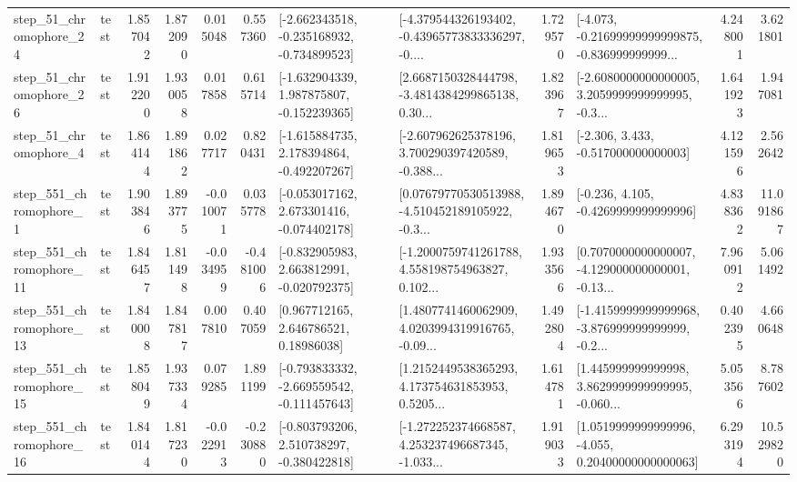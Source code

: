 \begin{tabular}{llrrrrllrlrr}
   step\_51\_chromophore\_24 &      test &      1.857042 &    1.872090 &      0.015048 &  0.557360 &  [-2.662343518, -0.235168932, -0.734899523] &  [-4.379544326193402, -0.43965773833336297, -0.... &       1.729570 &  [-4.073, -0.21699999999999875, -0.836999999999... &            4.248001 &          3.621801 \\
   step\_51\_chromophore\_26 &      test &      1.912200 &    1.930058 &      0.017858 &  0.615714 &   [-1.632904339, 1.987875807, -0.152239365] &  [2.6687150328444798, -3.4814384299865138, 0.30... &       1.823967 &  [-2.6080000000000005, 3.2059999999999995, -0.3... &            1.641923 &          1.947081 \\
    step\_51\_chromophore\_4 &      test &      1.864144 &    1.891862 &      0.027717 &  0.820431 &   [-1.615884735, 2.178394864, -0.492207267] &  [-2.607962625378196, 3.700290397420589, -0.388... &       1.819653 &                [-2.306, 3.433, -0.517000000000003] &            4.121596 &          2.562642 \\
   step\_551\_chromophore\_1 &      test &      1.903846 &    1.893775 &     -0.010071 &  0.035778 &   [-0.053017162, 2.673301416, -0.074402178] &  [0.07679770530513988, -4.510452189105922, -0.3... &       1.894670 &               [-0.236, 4.105, -0.4269999999999996] &            4.838362 &         11.091867 \\
  step\_551\_chromophore\_11 &      test &      1.846457 &    1.811498 &     -0.034959 & -0.481006 &   [-0.832905983, 2.663812991, -0.020792375] &  [-1.2000759741261788, 4.558198754963827, 0.102... &       1.933566 &  [0.7070000000000007, -4.129000000000001, -0.13... &            7.960912 &          5.061492 \\
  step\_551\_chromophore\_13 &      test &      1.840008 &    1.847817 &      0.007810 &  0.407059 &      [0.967712165, 2.646786521, 0.18986038] &  [1.4807741460062909, 4.0203994319916765, -0.09... &       1.492804 &  [-1.4159999999999968, -3.876999999999999, -0.2... &            0.402395 &          4.660648 \\
  step\_551\_chromophore\_15 &      test &      1.858049 &    1.937334 &      0.079285 &  1.891199 &  [-0.793833332, -2.669559542, -0.111457643] &  [1.2152449538365293, 4.173754631853953, 0.5205... &       1.614781 &  [1.445999999999998, 3.8629999999999995, -0.060... &            5.053566 &          8.787602 \\
  step\_551\_chromophore\_16 &      test &      1.840144 &    1.817230 &     -0.022913 & -0.230880 &   [-0.803793206, 2.510738297, -0.380422818] &  [-1.272252374668587, 4.253237496687345, -1.033... &       1.919033 &  [1.0519999999999996, -4.055, 0.20400000000000063] &            6.293194 &         10.529820 \\

\end{tabular}
